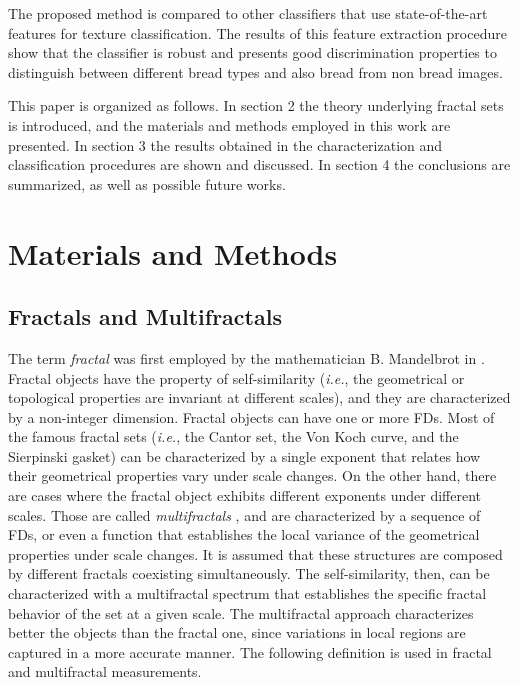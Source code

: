 The proposed method is compared to other classifiers that use state-of-the-art features for texture classification. The results of this feature extraction procedure show that the classifier is robust and presents good discrimination properties to distinguish between different bread types and also bread from non bread images.

This paper is organized as follows. In section 2 the theory underlying fractal sets is introduced, and the materials and methods employed in this work are presented. In section 3 the results obtained in the characterization and classification procedures are shown and discussed. In section 4 the conclusions are summarized, as well as possible future works.


\section{Materials and Methods}
\label{sec:1}
\subsection{Fractals and Multifractals}
\label{sec:2}

The term {\em fractal} was first employed by the mathematician B. Mandelbrot in \cite{Mandelbrot83}. Fractal objects have the property of self-similarity ({\em i.e.}, the geometrical or topological properties are invariant at different scales), and they are characterized by a non-integer dimension. Fractal objects can have one or more FDs. Most of the famous fractal sets ({\em i.e.}, the Cantor set, the Von Koch curve, and the Sierpinski gasket) can be characterized by a single exponent that relates how their geometrical properties vary under scale changes. On the other hand, there are cases where the fractal object exhibits different exponents under different scales. Those are called {\it multifractals} \cite{Mandelbrot89}, and are characterized by a sequence of FDs, or even a function that establishes the local variance of the geometrical properties under scale changes. It is assumed that these structures are composed by different fractals coexisting simultaneously. The self-similarity, then, can be characterized with a multifractal spectrum that establishes the specific fractal behavior of the set at a given scale. The multifractal approach characterizes better the objects than the fractal one, since variations in local regions are captured in a more accurate manner. The following definition is used in fractal and multifractal measurements.


